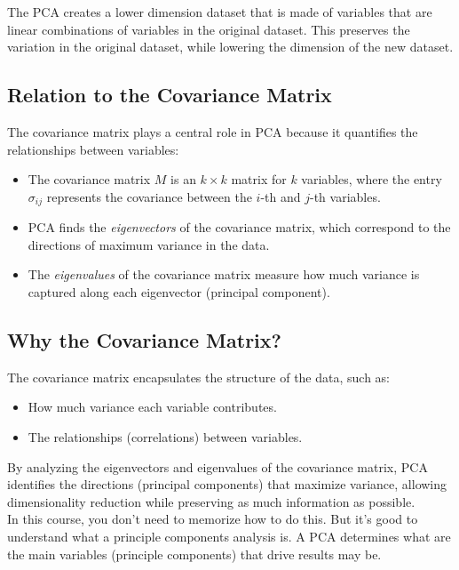 \documentclass{article}
\begin{document}
The PCA creates a lower dimension dataset that is made of variables that are linear combinations of variables in the original dataset. This preserves the variation in the original dataset, while lowering the dimension of the new dataset. 

\subsection*{Relation to the Covariance Matrix}

The covariance matrix plays a central role in PCA because it quantifies the relationships between variables:
\begin{itemize}
    \item The covariance matrix \( M \) is an \( k \times k\) matrix for \( k \) variables, where the entry \( \sigma_{ij} \) represents the covariance between the \( i \)-th and \( j \)-th variables.
    \item PCA finds the \textit{eigenvectors} of the covariance matrix, which correspond to the directions of maximum variance in the data.
    \item The \textit{eigenvalues} of the covariance matrix measure how much variance is captured along each eigenvector (principal component).
\end{itemize}

\subsection*{Why the Covariance Matrix?}

The covariance matrix encapsulates the structure of the data, such as:
\begin{itemize}
    \item How much variance each variable contributes.
    \item The relationships (correlations) between variables.
\end{itemize}

By analyzing the eigenvectors and eigenvalues of the covariance matrix, PCA identifies the directions (principal components) that maximize variance, allowing dimensionality reduction while preserving as much information as possible.\\


In this course, you don't need to memorize how to do this. But it's good to understand what a principle components analysis is. A PCA determines what are the main variables (principle components) that drive results may be. 
\end{document}

